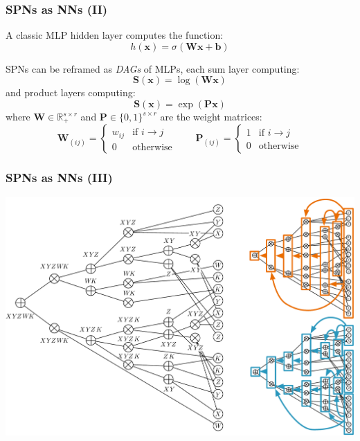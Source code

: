 \documentclass[10pt, t, xcolor={usenames,dvipsnames,svgnames}, compress]{beamer}
\begin{document}
\begin{frame}
  \frametitle{SPNs as NNs (II)}
  \small
  A classic MLP hidden layer computes the function:
  $$h(\mathbf{x}) =\sigma(\mathbf{W}\mathbf{x}+ \mathbf{b})$$

  SPNs can be reframed as \textit{DAGs} of MLPs, each sum layer
  computing:
  $$\mathbf{S}(\mathbf{x}) =
  \log(\mathbf{W}\mathbf{x})$$
  and product layers computing:
  $$\mathbf{S}(\mathbf{x}) = \exp(\mathbf{P}\mathbf{x})$$
  where
  $\mathbf{W}\in\mathbb{R}_{+}^{s\times r}$ and $\mathbf{P}\in\{0,
  1\}^{s\times r}$ are the weight matrices:
  \begin{equation*}
    \mathbf{W}_{(ij)}= \begin{cases}
      w_{ij} &\text{if $i\rightarrow j$}\\
      0& \text{otherwise}
    \end{cases}\quad\quad\mathbf{P}_{(ij)}=
    \begin{cases}
      1 &\text{if $i\rightarrow j$}\\
      0& \text{otherwise}
    \end{cases}
  \end{equation*}
\end{frame}

\begin{frame}
  \frametitle{SPNs as NNs (III)}
  \begin{center}
    \includegraphics[width=0.8\columnwidth]{figures/layered-spn.pdf}
  \end{center}
\end{frame}
\end{document}
